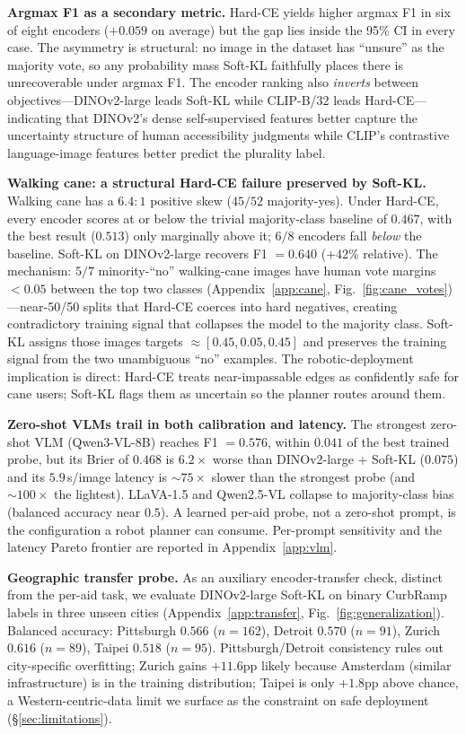 \documentclass{article}
\begin{document}
\textbf{Argmax F1 as a secondary metric.} Hard-CE yields higher argmax F1 in six of eight encoders ($+0.059$ on average) but the gap lies inside the 95\% CI in every case. The asymmetry is structural: no image in the dataset has ``unsure'' as the majority vote, so any probability mass Soft-KL faithfully places there is unrecoverable under argmax F1. The encoder ranking also \emph{inverts} between objectives---DINOv2-large leads Soft-KL while CLIP-B/32 leads Hard-CE---indicating that DINOv2's dense self-supervised features better capture the uncertainty structure of human accessibility judgments while CLIP's contrastive language-image features better predict the plurality label.

\textbf{Walking cane: a structural Hard-CE failure preserved by Soft-KL.} Walking cane has a $6.4{:}1$ positive skew ($45/52$ majority-yes). Under Hard-CE, every encoder scores at or below the trivial majority-class baseline of $0.467$, with the best result ($0.513$) only marginally above it; $6/8$ encoders fall \emph{below} the baseline. Soft-KL on DINOv2-large recovers F1 $= 0.640$ ($+42\%$ relative). The mechanism: $5/7$ minority-``no'' walking-cane images have human vote margins $<0.05$ between the top two classes (Appendix~\ref{app:cane}, Fig.~\ref{fig:cane_votes})---near-50/50 splits that Hard-CE coerces into hard negatives, creating contradictory training signal that collapses the model to the majority class. Soft-KL assigns those images targets $\approx[0.45, 0.05, 0.45]$ and preserves the training signal from the two unambiguous ``no'' examples. The robotic-deployment implication is direct: Hard-CE treats near-impassable edges as confidently safe for cane users; Soft-KL flags them as uncertain so the planner routes around them.

\textbf{Zero-shot VLMs trail in both calibration and latency.} The strongest zero-shot VLM (Qwen3-VL-8B) reaches F1 $= 0.576$, within $0.041$ of the best trained probe, but its Brier of $0.468$ is $6.2\times$ worse than DINOv2-large + Soft-KL ($0.075$) and its $5.9$\,s/image latency is $\sim 75\times$ slower than the strongest probe (and $\sim 100\times$ the lightest). LLaVA-1.5 and Qwen2.5-VL collapse to majority-class bias (balanced accuracy near $0.5$). A learned per-aid probe, not a zero-shot prompt, is the configuration a robot planner can consume. Per-prompt sensitivity and the latency Pareto frontier are reported in Appendix~\ref{app:vlm}.

\textbf{Geographic transfer probe.} As an auxiliary encoder-transfer check, distinct from the per-aid task, we evaluate DINOv2-large Soft-KL on binary CurbRamp labels in three unseen cities (Appendix~\ref{app:transfer}, Fig.~\ref{fig:generalization}). Balanced accuracy: Pittsburgh $0.566$ ($n=162$), Detroit $0.570$ ($n=91$), Zurich $0.616$ ($n=89$), Taipei $0.518$ ($n=95$). Pittsburgh/Detroit consistency rules out city-specific overfitting; Zurich gains $+11.6$pp likely because Amsterdam (similar infrastructure) is in the training distribution; Taipei is only $+1.8$pp above chance, a Western-centric-data limit we surface as the constraint on safe deployment (\S\ref{sec:limitations}).
\end{document}
